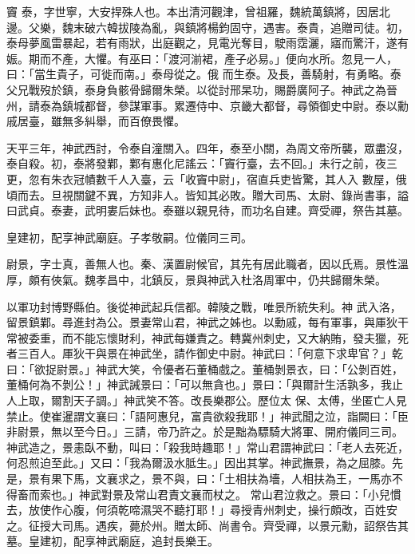 
\begin{pinyinscope}

 竇
 泰，字世寧，大安捍殊人也。本出清河觀津，曾祖羅，魏統萬鎮將，因居北邊。父樂，魏末破六韓拔陵為亂，與鎮將楊鈞固守，遇害。泰貴，追贈司徒。初，泰母夢風雷暴起，若有雨狀，出庭觀之，見電光奪目，駛雨霑灑，寤而驚汗，遂有娠。期而不產，大懼。有巫曰：「渡河湔裙，產子必易。」便向水所。忽見一人，曰：「當生貴子，可徙而南。」泰母從之。俄
 而生泰。及長，善騎射，有勇略。泰父兄戰歿於鎮，泰身負骸骨歸爾朱榮。以從討邢杲功，賜爵廣阿子。神武之為晉州，請泰為鎮城都督，參謀軍事。累遷侍中、京畿大都督，尋領御史中尉。泰以勳戚居臺，雖無多糾舉，而百僚畏懼。



 天平三年，神武西討，令泰自潼關入。四年，泰至小關，為周文帝所襲，眾盡沒，泰自殺。初，泰將發鄴，鄴有惠化尼謠云：「竇行臺，去不回。」未行之前，夜三更，忽有朱衣冠幘數千人入臺，云「收竇中尉」，宿直兵吏皆驚，其人入
 數屋，俄頃而去。旦視關鍵不異，方知非人。皆知其必敗。贈大司馬、太尉、錄尚書事，謚曰武貞。泰妻，武明婁后妹也。泰雖以親見待，而功名自建。齊受禪，祭告其墓。



 皇建初，配享神武廟庭。子孝敬嗣。位儀同三司。



 尉景，字士真，善無人也。秦、漢置尉候官，其先有居此職者，因以氏焉。景性溫厚，頗有俠氣。魏孝昌中，北鎮反，景與神武入杜洛周軍中，仍共歸爾朱榮。



 以軍功封博野縣伯。後從神武起兵信都。韓陵之戰，唯景所統失利。神
 武入洛，留景鎮鄴。尋進封為公。景妻常山君，神武之姊也。以勳戚，每有軍事，與厙狄干常被委重，而不能忘懷財利，神武每嫌責之。轉冀州刺史，又大納賄，發夫獵，死者三百人。厙狄干與景在神武坐，請作御史中尉。神武曰：「何意下求卑官？」乾曰：「欲捉尉景。」神武大笑，令優者石董桶戲之。董桶剝景衣，曰：「公剝百姓，董桶何為不剝公！」神武誡景曰：「可以無貪也。」景曰：「與爾計生活孰多，我止人上取，爾割天子調。」神武笑不答。改長樂郡公。歷位太
 保、太傅，坐匿亡人見禁止。使崔暹謂文襄曰：「語阿惠兒，富貴欲殺我耶！」神武聞之泣，詣闕曰：「臣非尉景，無以至今日。」三請，帝乃許之。於是黜為驃騎大將軍、開府儀同三司。神武造之，景恚臥不動，叫曰：「殺我時趣耶！」常山君謂神武曰：「老人去死近，何忍煎迫至此。」又曰：「我為爾汲水胝生。」因出其掌。神武撫景，為之屈膝。先是，景有果下馬，文襄求之，景不與，曰：「土相扶為墻，人相扶為王，一馬亦不得畜而索也。」神武對景及常山君責文襄而杖之。
 常山君泣救之。景曰：「小兒慣去，放使作心腹，何須乾啼濕哭不聽打耶！」尋授青州刺史，操行頗改，百姓安之。征授大司馬。遇疾，薨於州。贈太師、尚書令。齊受禪，以景元勳，詔祭告其墓。皇建初，配享神武廟庭，追封長樂王。




\end{pinyinscope}
